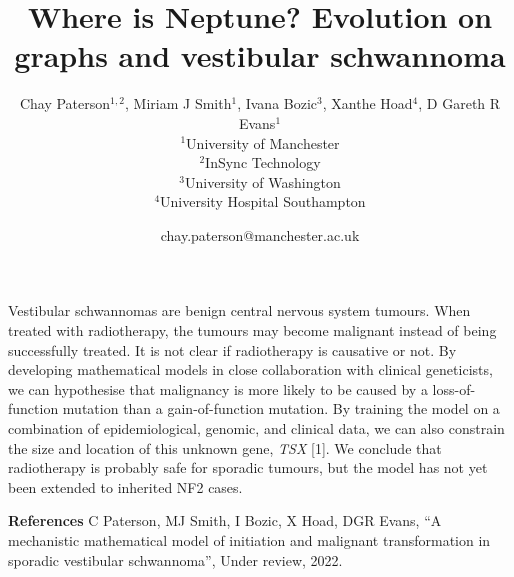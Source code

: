 \documentclass[a4paper]{article}
\title{Where is Neptune? Evolution on graphs and vestibular schwannoma}
\author{Chay Paterson$^{1,2}$, Miriam J Smith$^{1}$, Ivana Bozic$^{3}$, Xanthe
Hoad$^{4}$, D Gareth R Evans$^{1}$  \\
        \small $^{1}$University of Manchester \\
        \small $^{2}$InSync Technology \\
        \small $^{3}$University of Washington \\
        \small $^{4}$University Hospital Southampton \\
}
\date{chay.paterson@manchester.ac.uk} %
\begin{document}
\maketitle

Vestibular schwannomas are benign central nervous system tumours. When treated
with radiotherapy, the tumours may become malignant instead of being
successfully treated. It is not clear if radiotherapy is causative or not. By
developing mathematical models in close collaboration with clinical geneticists,
we can hypothesise that malignancy is more likely to be caused by a
loss-of-function mutation than a gain-of-function mutation. By training the model on a combination of epidemiological, genomic, and clinical data, we can also constrain
the size and location of this unknown gene, \emph{TSX} [1]. We conclude that
radiotherapy is probably safe for sporadic tumours, but the model has not yet
been extended to inherited NF2 cases.

{\bf References}
\newline
[1] C Paterson, MJ Smith, I Bozic, X Hoad, DGR Evans, ``A mechanistic mathematical model of initiation and malignant transformation in sporadic vestibular schwannoma'', Under review, 2022.
\end{document}

